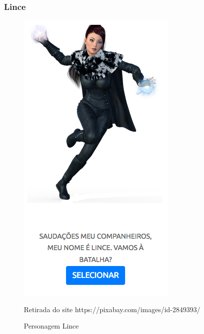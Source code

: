 \subsubsection{Lince}
\begin{figure}[h]
	\centering
	\includegraphics[keepaspectratio=true,scale=0.6]{figuras/lince.png}
	\caption{Personagem Lince}
	Retirada do site https://pixabay.com/images/id-2849393/
	\label{lince}
\end{figure}
\clearpage
